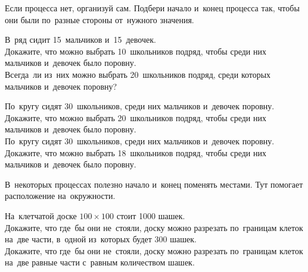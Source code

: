 Если процесса нет, организуй сам.
Подбери начало и~конец процесса так, чтобы они были по~разные стороны
от~нужного значения.

\begin{problems}

\item
В~ряд сидит 15~мальчиков и~15~девочек.
\\
\subproblem
Докажите, что можно выбрать 10~школьников подряд, чтобы среди них мальчиков
и~девочек было поровну.
\\
\subproblem
Всегда~ли из~них можно выбрать 20~школьников подряд, среди которых мальчиков
и~девочек поровну?

\item
\subproblem
По~кругу сидят 30~школьников, среди них мальчиков и~девочек поровну.
Докажите, что можно выбрать 20~школьников подряд, чтобы среди них мальчиков
и~девочек было поровну.
\\
\subproblem
По~кругу сидят 30~школьников, среди них мальчиков и~девочек поровну.
Докажите, что можно выбрать 18~школьников подряд, чтобы среди них мальчиков
и~девочек было поровну.

\end{problems}

В~некоторых процессах полезно начало и~конец поменять местами.
Тут помогает расположение на~окружности. 

\begin{problems}

\item
На~клетчатой доске $100 \times 100$ стоит 1000 шашек. 
\\
\subproblem
Докажите, что где~бы они не~стояли, доску можно разрезать по~границам клеток
на~две части, в~одной из~которых будет 300 шашек.
\\
\subproblem
Докажите, что где~бы они не~стояли, доску можно разрезать по~границам клеток
на~две равные части с~равным количеством шашек.

\end{problems}

